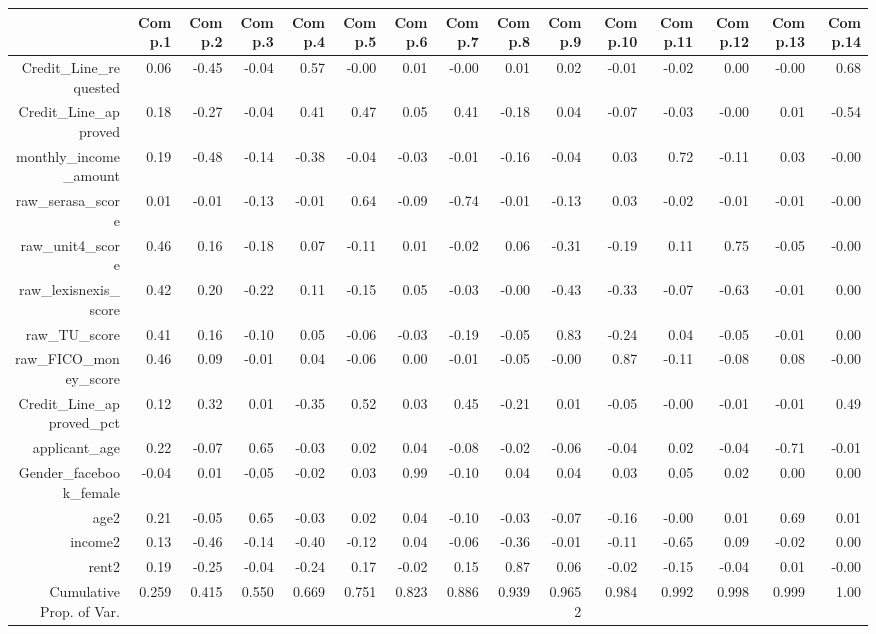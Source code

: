 \documentclass[a4paper, landscape]{article}
\begin{document}
\begin{table}[ht]
\centering
\begin{tabular}{rrrrrrrrrrrrrrr}
  \hline
 & Comp.1 & Comp.2 & Comp.3 & Comp.4 & Comp.5 & Comp.6 & Comp.7 & Comp.8 & Comp.9 & Comp.10 & Comp.11 & Comp.12 & Comp.13 & Comp.14 \\ 
  \hline
Credit\_Line\_requested & 0.06 & -0.45 & -0.04 & 0.57 & -0.00 & 0.01 & -0.00 & 0.01 & 0.02 & -0.01 & -0.02 & 0.00 & -0.00 & 0.68 \\ 
  Credit\_Line\_approved & 0.18 & -0.27 & -0.04 & 0.41 & 0.47 & 0.05 & 0.41 & -0.18 & 0.04 & -0.07 & -0.03 & -0.00 & 0.01 & -0.54 \\ 
  monthly\_income\_amount & 0.19 & -0.48 & -0.14 & -0.38 & -0.04 & -0.03 & -0.01 & -0.16 & -0.04 & 0.03 & 0.72 & -0.11 & 0.03 & -0.00 \\ 
  raw\_serasa\_score & 0.01 & -0.01 & -0.13 & -0.01 & 0.64 & -0.09 & -0.74 & -0.01 & -0.13 & 0.03 & -0.02 & -0.01 & -0.01 & -0.00 \\ 
  raw\_unit4\_score & 0.46 & 0.16 & -0.18 & 0.07 & -0.11 & 0.01 & -0.02 & 0.06 & -0.31 & -0.19 & 0.11 & 0.75 & -0.05 & -0.00 \\ 
  raw\_lexisnexis\_score & 0.42 & 0.20 & -0.22 & 0.11 & -0.15 & 0.05 & -0.03 & -0.00 & -0.43 & -0.33 & -0.07 & -0.63 & -0.01 & 0.00 \\ 
  raw\_TU\_score & 0.41 & 0.16 & -0.10 & 0.05 & -0.06 & -0.03 & -0.19 & -0.05 & 0.83 & -0.24 & 0.04 & -0.05 & -0.01 & 0.00 \\ 
  raw\_FICO\_money\_score & 0.46 & 0.09 & -0.01 & 0.04 & -0.06 & 0.00 & -0.01 & -0.05 & -0.00 & 0.87 & -0.11 & -0.08 & 0.08 & -0.00 \\ 
  Credit\_Line\_approved\_pct & 0.12 & 0.32 & 0.01 & -0.35 & 0.52 & 0.03 & 0.45 & -0.21 & 0.01 & -0.05 & -0.00 & -0.01 & -0.01 & 0.49 \\ 
  applicant\_age & 0.22 & -0.07 & 0.65 & -0.03 & 0.02 & 0.04 & -0.08 & -0.02 & -0.06 & -0.04 & 0.02 & -0.04 & -0.71 & -0.01 \\ 
  Gender\_facebook\_female & -0.04 & 0.01 & -0.05 & -0.02 & 0.03 & 0.99 & -0.10 & 0.04 & 0.04 & 0.03 & 0.05 & 0.02 & 0.00 & 0.00 \\ 
  age2 & 0.21 & -0.05 & 0.65 & -0.03 & 0.02 & 0.04 & -0.10 & -0.03 & -0.07 & -0.16 & -0.00 & 0.01 & 0.69 & 0.01 \\ 
  income2 & 0.13 & -0.46 & -0.14 & -0.40 & -0.12 & 0.04 & -0.06 & -0.36 & -0.01 & -0.11 & -0.65 & 0.09 & -0.02 & 0.00 \\ 
  rent2 & 0.19 & -0.25 & -0.04 & -0.24 & 0.17 & -0.02 & 0.15 & 0.87 & 0.06 & -0.02 & -0.15 & -0.04 & 0.01 & -0.00 \\ 
   \hline
   Cumulative Prop. of Var. & 0.259 & 0.415 & 0.550 & 0.669 & 0.751 & 0.823 & 0.886 & 0.939 & 0.9652 & 0.984 & 0.992 & 0.998 & 0.999 & 1.00 \\
   \hline
\end{tabular}
\end{table}
\end{document}

